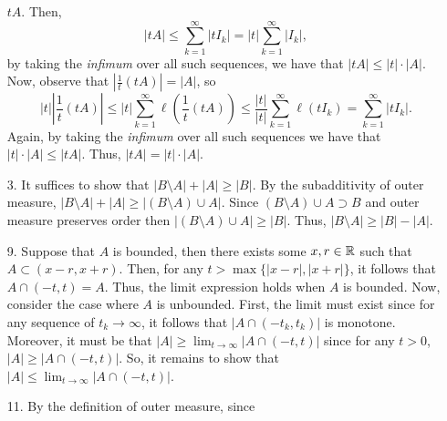 \documentclass{article}
\theoremstyle{remark}
\begin{document}
\begin{enumerate}[leftmargin=*]
    $tA$. Then,
    \begin{equation*}
        |tA| \leq \sum_{k=1}^\infty |tI_k| = |t|\sum_{k=1}^\infty |I_k|,
    \end{equation*}
    by taking the \textit{infimum} over all such sequences, we have that $|tA|
    \leq |t|\cdot |A|$. Now, observe that $|\frac{1}{t} (t A)| = |A|$, so 
    \begin{equation*}
        |t| \left|\frac{1}{t} (tA)\right| \leq |t| \sum_{k=1}^\infty \ell(\frac{1}{t}(tA)) 
        \leq \frac{|t|}{|t|}\sum_{k=1}^\infty \ell(tI_k) = \sum_{k=1}^\infty |tI_k|.
    \end{equation*}
    Again, by taking the \textit{infimum} over all such sequences we have that
    $|t|\cdot |A| \leq |tA|$. Thus, $|tA| = |t|\cdot |A|$. 

    \item[3.] It suffices to show that $|B\setminus A| + |A| \geq |B|$. By the
    subadditivity of outer measure, $|B\setminus A| + |A| \geq |(B\setminus A)
    \cup A|$. Since $(B \setminus A)\cup A \supset B$ and outer measure
    preserves order then $|(B\setminus A) \cup A| \geq |B|$. Thus, $|B\setminus
    A| \geq |B| - |A|$. 

    \item[9.] Suppose that $A$ is bounded, then there exists some $x, r \in \mathbb{R}$
    such that $A \subset (x-r, x+r)$. Then, for any $t > \max\{|x-r|, |x+r|\}$,
    it follows that $A \cap (-t, t) = A$. Thus, the limit expression holds when
    $A$ is bounded. Now, consider the case where $A$ is unbounded. First, the
    limit must exist since for any sequence of $t_k \to \infty$, it follows that
    $|A \cap (-t_k,t_k)|$ is monotone. Moreover, it must be that $|A| \geq
    \lim_{t\to\infty} |A\cap (-t,t)|$ since for any $t > 0$, $|A| \geq |A \cap
    (-t,t)|$. So, it remains to show that $|A| \leq \lim_{t \to \infty} |A \cap
    (-t, t)|$. 

    

    \item[11.] By the definition of outer measure, since



\end{enumerate}
\end{document}
